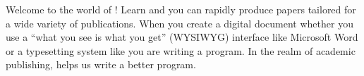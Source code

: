\begin{preface}
Welcome to the world of ! Learn  and you can rapidly
produce papers tailored for a wide variety of publications.
When you create a digital
document whether you use a ``what you see is what you get''
(WYSIWYG) interface like Microsoft Word or a typesetting system like
 you are writing a program.  In the realm of academic publishing,
 helps us write a better program.   
\end{preface}


